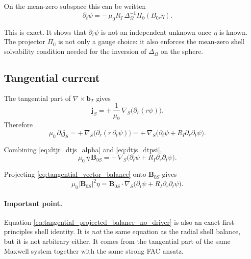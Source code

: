 \documentclass[11pt,a4paper]{article}
\begin{document}
On the mean-zero subspace this can be written
\begin{equation}
\partial_t \psi
=
-\,\mu_0 R_I\, \Delta_\Omega^{-1}\Pi_0(B_{0r}\eta).
\label{eq:dtpsi_from_eta}
\end{equation}

This is exact. It shows that $\partial_t \psi$ is not an independent unknown
once $\eta$ is known.
The projector \(\Pi_0\) is not only a gauge choice: it also enforces the
mean-zero shell solvability condition needed for the inversion of
\(\Delta_\Omega\) on the sphere.

\subsection*{Tangential current}

The tangential part of $\nabla\times \mathbf b_T$ gives
\begin{equation}
\mathbf j_S
=
+\,\frac{1}{\mu_0}\,\nabla_S\!\bigl(\partial_r(r\psi)\bigr).
\label{eq:js_psi}
\end{equation}
Therefore
\begin{equation}
\mu_0\,\partial_t \mathbf j_S
=
+\,\nabla_S\!\bigl(\partial_r(r\,\partial_t\psi)\bigr)
=
+\,\nabla_S\!\bigl(\partial_t\psi + R_I \partial_r\partial_t\psi\bigr).
\label{eq:dtjs_dtpsi}
\end{equation}

Combining \eqref{eq:dtjr_dtjs_alpha} and \eqref{eq:dtjs_dtpsi},
\begin{equation}
\mu_0\,\eta\,\mathbf B_{0S}
=
+\,\nabla_S\!\bigl(\partial_t\psi + R_I \partial_r\partial_t\psi\bigr).
\label{eq:tangential_vector_balance}
\end{equation}

Projecting \eqref{eq:tangential_vector_balance} onto $\mathbf B_{0S}$ gives
\begin{equation}
\mu_0 |\mathbf B_{0S}|^2 \eta
=
\mathbf B_{0S}\cdot \nabla_S\!\bigl(\partial_t\psi + R_I \partial_r\partial_t\psi\bigr).
\label{eq:tangential_projected_balance_no_driver}
\end{equation}

\paragraph{Important point.}
Equation \eqref{eq:tangential_projected_balance_no_driver} is also an exact
first-principles shell identity. It is \emph{not} the same equation as the
radial shell balance, but it is not arbitrary either. It comes from the
tangential part of the same Maxwell system together with the same strong FAC
ansatz.
\end{document}

